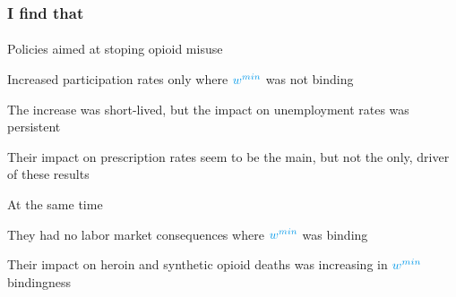\begin{frame}

    \frametitle{I find that} %
    \framesubtitle{}  %
    \rmfamily %
    
    \begin{wideitemize}
        \item Policies aimed at stoping opioid misuse
        \vspace{9pt}
        \begin{wideitemize}
            \item[\textcolor{fblu}{\textbullet}] Increased participation rates only where \(\textcolor{fblu}{w^{min}}\) \textcolor{fblu}{was not binding}
            \item[\textcolor{fblu}{\textbullet}] The increase was short-lived, but the impact on unemployment rates was persistent
            \item[\textcolor{fblu}{\textbullet}] Their impact on prescription rates seem to be the main, but not the only, driver of these results
        \end{wideitemize}
        \item At the same time
        \vspace{9pt}
        \begin{wideitemize}
            \item[\textcolor{fblu}{\textbullet}] They had no labor market consequences where \(\textcolor{fblu}{w^{min}}\) \textcolor{fblu}{was binding}
            \item[\textcolor{fblu}{\textbullet}] Their impact on heroin and synthetic opioid deaths was increasing in \(\textcolor{fblu}{w^{min}}\) bindingness 
        \end{wideitemize}
    \end{wideitemize}
    
\end{frame}

